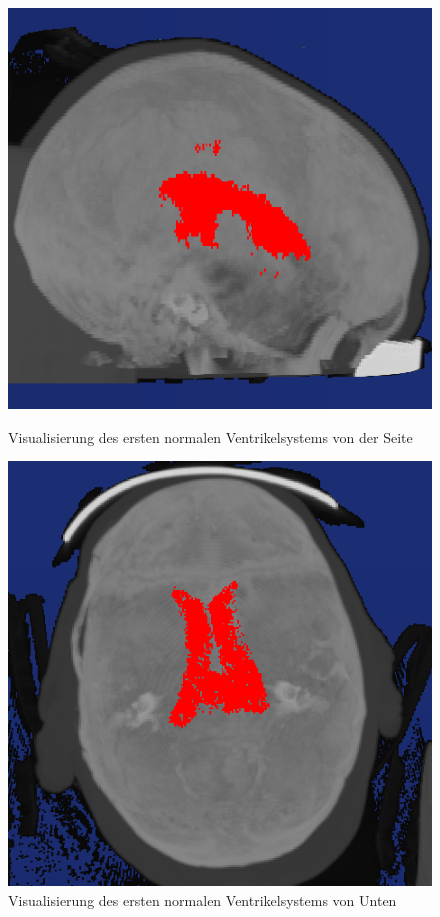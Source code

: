 \begin{figure}[H]
\begin{minipage}[b]{.5\textwidth}
  \centering
  \includegraphics[width=.98\linewidth, height=.98\linewidth]{Logos/Normal1/Seite2.PNG}
  \caption{Visualisierung des ersten normalen Ventrikelsystems von der Seite}
  \label{fig:norm1_s}
\end{minipage}%
\begin{minipage}[b]{.5\textwidth}
  \centering
  \includegraphics[width=.98\linewidth, height=.98\linewidth]{Logos/Normal1/Unten3.PNG}
  \caption{Visualisierung des ersten normalen Ventrikelsystems von Unten}
  \label{fig:norm1_u}
\end{minipage}
\end{figure}

